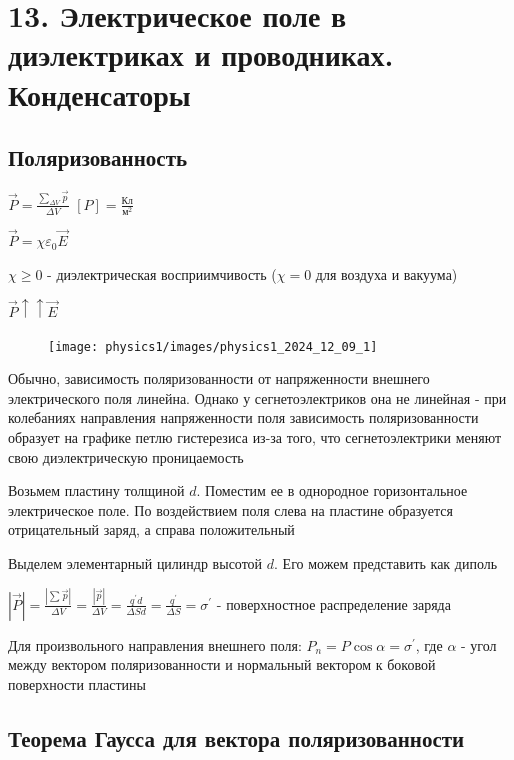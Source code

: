 \documentclass[12pt]{article}
\begin{document}
\section{13. Электрическое поле в диэлектриках и проводниках. Конденсаторы}

\subsection{Поляризованность}

$\vec{P} = \frac{\sum_{\Delta V} \vec{p}}{\Delta V}$ \hfill $[P] = \frac{\text{Кл}}{\text{м}^2}$

$\vec{P} = \chi \varepsilon_0 \vec{E}$

$\chi \geq 0$ - диэлектрическая восприимчивость ($\chi = 0$ для воздуха и вакуума)

$\vec{P} \uparrow\uparrow \vec{E}$

\begin{minipage}{\textwidth}
    \begin{figure}
        \texttt{[image: physics1/images/physics1\_2024\_12\_09\_1]}
    \end{figure}

    Обычно, зависимость поляризованности от напряженности внешнего электрического поля линейна. 
    Однако у сегнетоэлектриков она не линейная - при колебаниях направления напряженности поля зависимость поляризованности
    образует на графике петлю гистерезиса из-за того, что сегнетоэлектрики меняют свою диэлектрическую проницаемость

    Возьмем пластину толщиной $d$. Поместим ее в однородное горизонтальное электрическое поле. 
    По воздействием поля слева на пластине образуется отрицательный заряд, а справа положительный

    Выделем элементарный цилиндр высотой $d$. Его можем представить как диполь

    $|\vec{P}| = \frac{|\sum \vec{p}|}{\Delta V} = \frac{|\vec{p}|}{\Delta V} = \frac{q^\prime d}{\Delta S d} = \frac{q^\prime}{\Delta S} = \sigma^\prime$ - поверхностное распределение заряда

    Для произвольного направления внешнего поля: $P_n = P \cos\alpha = \sigma^\prime$, где $\alpha$ - угол между вектором поляризованности и нормальный вектором к боковой поверхности пластины

\end{minipage}

\subsection{Теорема Гаусса для вектора поляризованности}
\end{document}
